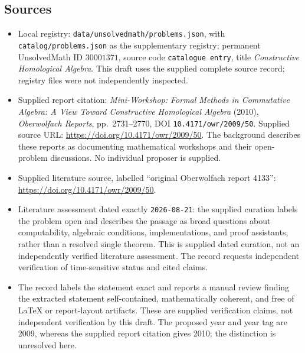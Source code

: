 \documentclass[11pt]{article}
\begin{document}
\subsection{Sources}
\begin{itemize}
\item Local registry: \texttt{data/unsolvedmath/problems.json}, with \texttt{catalog/problems.json} as the supplementary registry; permanent UnsolvedMath ID \(30001371\), source code \texttt{catalogue entry}, title \emph{Constructive Homological Algebra}. This draft uses the supplied complete source record; registry files were not independently inspected.
\item Supplied report citation: \emph{Mini-Workshop: Formal Methods in Commutative Algebra: A View Toward Constructive Homological Algebra} (2010), \emph{Oberwolfach Reports}, pp.\ 2731--2770, DOI \texttt{10.4171/owr/2009/50}. Supplied source URL: \url{https://doi.org/10.4171/owr/2009/50}. The background describes these reports as documenting mathematical workshops and their open-problem discussions. No individual proposer is supplied.
\item Supplied literature source, labelled ``original Oberwolfach report 4133'': \url{https://doi.org/10.4171/owr/2009/50}.
\item Literature assessment dated exactly \texttt{2026-08-21}: the supplied curation labels the problem open and describes the passage as broad questions about computability, algebraic conditions, implementations, and proof assistants, rather than a resolved single theorem. This is supplied dated curation, not an independently verified literature assessment. The record requests independent verification of time-sensitive status and cited claims.
\item The record labels the statement exact and reports a manual review finding the extracted statement self-contained, mathematically coherent, and free of LaTeX or report-layout artifacts. These are supplied verification claims, not independent verification by this draft. The proposed year and year tag are 2009, whereas the supplied report citation gives 2010; the distinction is unresolved here.
\end{itemize}
\end{document}
